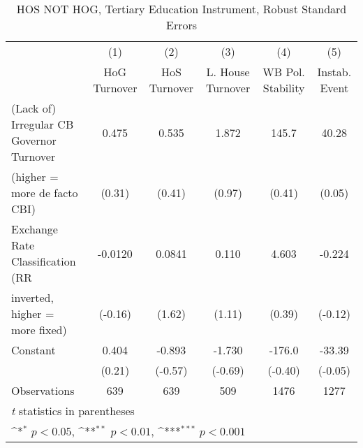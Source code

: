 \begin{table}[htbp]\centering
\def\sym#1{\ifmmode^{#1}\else\(^{#1}\)\fi}
\caption{HOS NOT HOG, Tertiary Education Instrument, Robust Standard Errors \label{NOhoshogIfivs2}}
\begin{tabular}{l*{5}{c}}
\toprule
                                        &\multicolumn{1}{c}{(1)}&\multicolumn{1}{c}{(2)}&\multicolumn{1}{c}{(3)}&\multicolumn{1}{c}{(4)}&\multicolumn{1}{c}{(5)}\\
                                        &\multicolumn{1}{c}{HoG Turnover}&\multicolumn{1}{c}{HoS Turnover}&\multicolumn{1}{c}{L. House Turnover}&\multicolumn{1}{c}{WB Pol. Stability}&\multicolumn{1}{c}{Instab. Event}\\
\midrule
(Lack of) Irregular CB Governor Turnover&    0.475         &    0.535         &    1.872         &    145.7         &    40.28         \\
(higher = more de facto CBI)            &   (0.31)         &   (0.41)         &   (0.97)         &   (0.41)         &   (0.05)         \\
\addlinespace
Exchange Rate Classification (RR        &  -0.0120         &   0.0841         &    0.110         &    4.603         &   -0.224         \\
inverted, higher = more fixed)          &  (-0.16)         &   (1.62)         &   (1.11)         &   (0.39)         &  (-0.12)         \\
\addlinespace
Constant                                &    0.404         &   -0.893         &   -1.730         &   -176.0         &   -33.39         \\
                                        &   (0.21)         &  (-0.57)         &  (-0.69)         &  (-0.40)         &  (-0.05)         \\
\midrule
Observations                            &      639         &      639         &      509         &     1476         &     1277         \\
\bottomrule
\multicolumn{6}{l}{\footnotesize \textit{t} statistics in parentheses}\\
\multicolumn{6}{l}{\footnotesize \sym{*} \(p<0.05\), \sym{**} \(p<0.01\), \sym{***} \(p<0.001\)}\\
\end{tabular}
\end{table}
